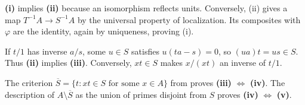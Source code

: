 \textbf{(i)} implies \textbf{(ii)} because an isomorphism reflects units. Conversely, (ii) gives a map $T^{-1}A\to S^{-1}A$ by the universal property of localization. Its composites with $\varphi$ are the identity, again by uniqueness, proving (i).

If $t/1$ has inverse $a/s$, some $u\in S$ satisfies $u(ta-s)=0$, so $(ua)t=us\in S$. Thus \textbf{(ii)} implies \textbf{(iii)}. Conversely, $xt\in S$ makes $x/(xt)$ an inverse of $t/1$.

The criterion $\overline S=\{t:xt\in S\text{ for some }x\in A\}$ from  proves \textbf{(iii)} $\Leftrightarrow$ \textbf{(iv)}. The description of $A\setminus\overline S$ as the union of primes disjoint from $S$ proves \textbf{(iv)} $\Leftrightarrow$ \textbf{(v)}.
